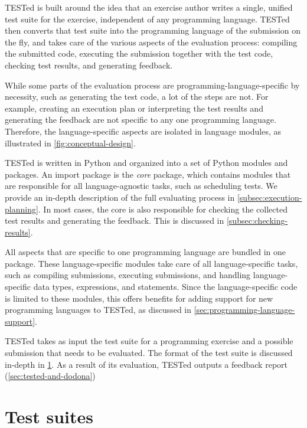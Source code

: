 \documentclass[../main]{subfiles}
\begin{document}
TESTed is built around the idea that an exercise author writes a single, unified test suite for the exercise, independent of any programming language.
TESTed then converts that test suite into the programming language of the submission on the fly, and takes care of the various aspects of the evaluation process: compiling the submitted code, executing the submission together with the test code, checking test results, and generating feedback.

While some parts of the evaluation process are programming-language-specific by necessity, such as generating the test code, a lot of the steps are not.
For example, creating an execution plan or interpreting the test results and generating the feedback are not specific to any one programming language.
Therefore, the language-specific aspects are isolated in language modules, as illustrated in \cref{fig:conceptual-design}.

\leavevmode{}%
TESTed is written in Python and organized into a set of Python modules and packages.
An import package is the \emph{core} package, which contains modules that are responsible for all language-agnostic tasks, such as scheduling tests.
We provide an in-depth description of the full evaluating process in \cref{subsec:execution-planning}.
In most cases, the core is also responsible for checking the collected test results and generating the feedback.
This is discussed in \cref{subsec:checking-results}.

All aspects that are specific to one programming language are bundled in one package.
These language-specific modules take care of all language-specific tasks, such as compiling submissions, executing submissions, and handling language-specific data types, expressions, and statements.
Since the language-specific code is limited to these modules, this offers benefits for adding support for new programming languages to TESTed, as discussed in \cref{sec:programming-language-support}.

TESTed takes as input the test suite for a programming exercise and a possible submission that needs to be evaluated.
The format of the test suite is discussed in-depth in \cref{sec:test-suites}.
As a result of its evaluation, TESTed outputs a feedback report (\cref{sec:tested-and-dodona})

\section{Test suites}\label{sec:test-suites}
\end{document}
